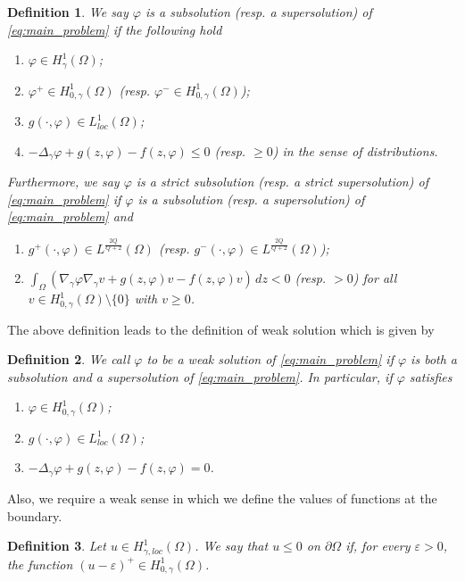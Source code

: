 \documentclass[11pt]{article}
\newtheorem{definition}{Definition}[section] %
\newcommand{\Gr}{\Delta_{\gamma}}
\newcommand{\gradgr}{\nabla_{\gamma}}
\newcommand{\spacegr}{H^{1}_{0,\gamma}(\Omega)}
\newcommand{\spaceg}{H^{1}_{\gamma}(\Omega)}
\begin{document}
\begin{definition}\label{def:weak_sub_super_solution_grushin}
We say $\varphi$ is a \textit{subsolution} (resp. a \textit{supersolution}) of \eqref{eq:main_problem} if the following hold
\begin{enumerate}
    \item[(i)] $\varphi \in \spaceg$;
    \item[(ii)] $\varphi^+ \in \spacegr$ (resp. $\varphi^- \in \spacegr$);
    \item[(iii)] $g(\cdot, \varphi) \in L_{loc}^1(\Omega)$;
    \item[(iv)] $-\Gr \varphi + g(z, \varphi) - f(z, \varphi) \leqslant 0$ (resp. $\geqslant 0$) in the sense of distributions.
\end{enumerate}
Furthermore, we say $\varphi$ is a \textit{strict subsolution} (resp. a \textit{strict supersolution}) of \eqref{eq:main_problem} if $\varphi$ is a subsolution (resp. a supersolution) of \eqref{eq:main_problem} and
\begin{enumerate}
    \item[(v)] $g^+(\cdot, \varphi) \in L^{\frac{2Q}{Q+2}}(\Omega)$ (resp. $g^-(\cdot, \varphi) \in L^{\frac{2Q}{Q+2}}(\Omega)$);
    \item[(vi)] $\int_\Omega (\gradgr \varphi \gradgr v + g(z, \varphi)v - f(z, \varphi)v) \, dz < 0$ (resp. $> 0$) for all $v \in \spacegr \setminus \{0\}$ with $v \geqslant 0$.
\end{enumerate}
\end{definition}

The above definition leads to the definition of weak solution which is given by

\begin{definition}
We call $\varphi$ to be a \textit{weak solution} of \eqref{eq:main_problem} if $\varphi$ is both a subsolution and a supersolution of \eqref{eq:main_problem}. In particular, if $\varphi$ satisfies 
\begin{enumerate}
    \item $\varphi \in \spacegr$;
    \item $g(\cdot, \varphi) \in L_{loc}^1(\Omega)$;
    \item $-\Gr \varphi + g(z, \varphi) - f(z, \varphi) = 0$.
\end{enumerate}   
\end{definition}



Also, we require a weak sense in which we define the values of functions at the boundary.
\begin{definition}\label{def:boundary_def}
Let $u \in H^{1}_{\gamma, loc}(\Omega)$. We say that $u \le 0$ on $\partial\Omega$ if, for every $\varepsilon > 0$, the function $(u - \varepsilon)^+ \in \spacegr$.
\end{definition}
\end{document}
